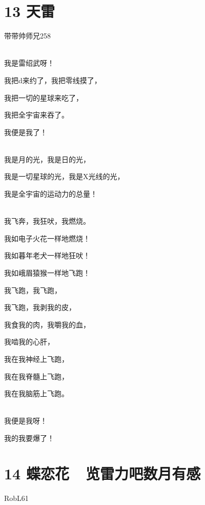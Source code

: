 \documentclass[UTF8,12pt,oneside]{ctexbook}
\begin{document}
    \section{13 天雷}
    \begin{center}
        \large
        \songti
        \normalsize
        
        带带帅师兄258
        
        ~\\
        我是雷绍武呀！
        
        我把d来约了，我把零线摸了，
        
        我把一切的星球来吃了，
        
        我把全宇宙来吞了。
        
        我便是我了！
        
        ~\\
        
        我是月的光，我是日的光，
        
        我是一切星球的光，我是X光线的光，
        
        我是全宇宙的运动力的总量！
        
        ~\\
        
        我飞奔，我狂吠，我燃烧。
        
        我如电子火花一样地燃烧！
        
        我如暮年老犬一样地狂吠！
        
        我如峨眉猿猴一样地飞跑！
        
        我飞跑，我飞跑，
        
        我飞跑，我剥我的皮，
        
        我食我的肉，我嚼我的血，
        
        我啮我的心肝，
        
        我在我神经上飞跑，
        
        我在我脊髓上飞跑，
        
        我在我脑筋上飞跑。
        
        ~\\
        
        我便是我呀！
        
        我的我要爆了！

    \end{center}
    
    \newpage
    
    \section{14 蝶恋花\ \ 览雷力吧数月有感}
    \begin{center}
        RobL61
        
    \end{center}
       
\end{document}
